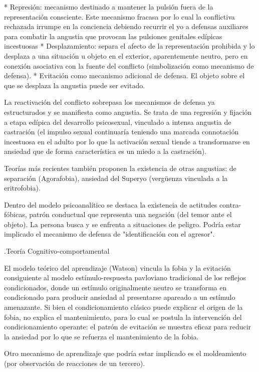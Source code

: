 * Represión: mecanismo destinado a mantener la pulsión fuera de la representación consciente. Este mecanismo fracasa por lo cual la conflictiva rechazada irrumpe en la conciencia debiendo recurrir el yo a defensas auxiliares para combatir la angustia que provocan las pulsiones genitales edípicas incestuosas
* Desplazamiento: separa el afecto de la representación prohibida y lo desplaza a una situación u objeto en el exterior, aparentemente neutro, pero en conexión asociativa con la fuente del conflicto (simbolización como mecanismo de defensa).
* Evitación como mecanismo adicional de defensa. El objeto sobre el que se desplaza la angustia puede ser evitado.

La reactivación del conflicto sobrepasa los mecanismos de defensa ya estructurados y se manifiesta como angustia. Se trata de una regresión y fijación a etapa edípica del desarrollo psicosexual, vinculado a intensa angustia de castración (el impulso sexual continuaría teniendo una marcada connotación incestuosa en el adulto por lo que la activación sexual tiende a transformarse en ansiedad que de forma característica es un miedo a la castración).

Teorías más recientes también proponen la existencia de otras angustias: de separación (Agorafobia), ansiedad del Superyo (vergüenza vinculada a la eritrofobia).

Dentro del modelo psicoanalítico se destaca la existencia de actitudes contra-fóbicas, patrón conductual que representa una negación (del temor ante el objeto). La persona busca y se enfrenta a situaciones de peligro. Podría estar implicado el mecanismo de defensa de "identificación con el agresor".

.Teoría Cognitivo-comportamental

El modelo teórico del aprendizaje (Watson) vincula la fobia y la evitación consiguiente al modelo estímulo-respuesta pavloviano tradicional de los reflejos condicionados, donde un estímulo originalmente neutro se transforma en condicionado para producir ansiedad al presentarse apareado a un estímulo amenazante. Si bien el condicionamiento clásico puede explicar el origen de la fobia, no explica el mantenimiento, para lo cual se postula la intervención del condicionamiento operante: el patrón de evitación se muestra eficaz para reducir la ansiedad por lo que se refuerza el mantenimiento de la fobia.

Otro mecanismo de aprendizaje que podría estar implicado es el moldeamiento (por observación de reacciones de un tercero).

